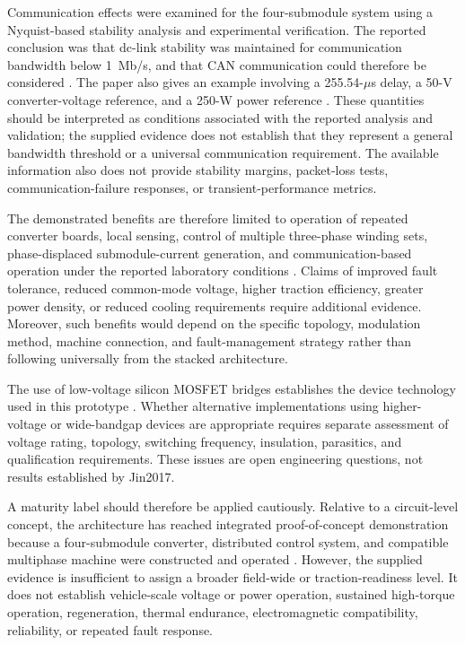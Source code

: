 Communication effects were examined for the four-submodule system using a Nyquist-based stability analysis and experimental verification. The reported conclusion was that dc-link stability was maintained for communication bandwidth below 1~Mb/s, and that CAN communication could therefore be considered \cite{Jin2017}. The paper also gives an example involving a 255.54-$\mu$s delay, a 50-V converter-voltage reference, and a 250-W power reference \cite{Jin2017}. These quantities should be interpreted as conditions associated with the reported analysis and validation; the supplied evidence does not establish that they represent a general bandwidth threshold or a universal communication requirement. The available information also does not provide stability margins, packet-loss tests, communication-failure responses, or transient-performance metrics. %

The demonstrated benefits are therefore limited to operation of repeated converter boards, local sensing, control of multiple three-phase winding sets, phase-displaced submodule-current generation, and communication-based operation under the reported laboratory conditions \cite{Jin2017}. Claims of improved fault tolerance, reduced common-mode voltage, higher traction efficiency, greater power density, or reduced cooling requirements require additional evidence. Moreover, such benefits would depend on the specific topology, modulation method, machine connection, and fault-management strategy rather than following universally from the stacked architecture. %

The use of low-voltage silicon MOSFET bridges establishes the device technology used in this prototype \cite{Jin2017}. Whether alternative implementations using higher-voltage or wide-bandgap devices are appropriate requires separate assessment of voltage rating, topology, switching frequency, insulation, parasitics, and qualification requirements. These issues are open engineering questions, not results established by Jin2017. %

A maturity label should therefore be applied cautiously. Relative to a circuit-level concept, the architecture has reached integrated proof-of-concept demonstration because a four-submodule converter, distributed control system, and compatible multiphase machine were constructed and operated \cite{Jin2017}. However, the supplied evidence is insufficient to assign a broader field-wide or traction-readiness level. It does not establish vehicle-scale voltage or power operation, sustained high-torque operation, regeneration, thermal endurance, electromagnetic compatibility, reliability, or repeated fault response. %

